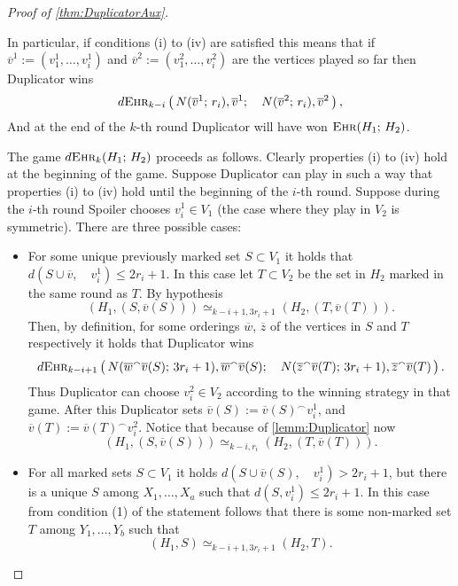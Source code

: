 \documentclass[12pt,notitlepage,a4paper]{article}
\theoremstyle{definition}
\newcommand{\ehr}{\textsc{Ehr}}
\begin{document}
\begin{proof}[Proof of \cref{thm:DuplicatorAux}]
\begin{itemize}
		
	\end{itemize}
	In particular, if conditions (i) to (iv) are satisfied this means
	that if $\overline{v}^1:=(v^1_1,\dots,v^1_i)$ and
	$\overline{v}^2:=(v^2_1,\dots, v^2_i)$ are the vertices played so far
	then Duplicator wins
	\[
	d\ehr_{k-i}\left(\,
	N(\overline{v}^1;\, r_i), \overline{v}^1; \quad
	N(\overline{v}^2;\, r_i),\overline{v}^2 \,
	\right),	
	\]
	And at the end of the $k$-th round Duplicator will have won
	$\ehr(H_1;\, H_2)$. \par
	The game $d\ehr_k(H_1; \, H_2)$ proceeds as follows.
	Clearly properties (i) to (iv) hold at the beginning of 
	the game.  Suppose
	Duplicator can play in such a way that properties (i) to (iv) hold 
	until the beginning of the $i$-th round. Suppose
	during the $i$-th round Spoiler chooses $v^1_i\in V_1$ 
	(the case where they play in $V_2$ is symmetric). There are 
	three possible cases:
	\begin{itemize}[leftmargin=*]
		\item For some unique previously marked set $S\subset V_1$ 
		it holds that $d(S\cup \overline{v},\quad v^1_i)\leq 2r_i +1$. 
		In this case let $T\subset V_2$ be the set in $H_2$ marked in the 
		same round as $T$. By hypothesis 
		\[ \left(H_1,(S,\overline{v}(S))\right)
		\simeq_{k-i+1,3r_i+1}
		\left(H_2,(T,\overline{v}(T))\right). 		
		\]
		Then, by definition,
		for some orderings $\overline{w}$, $\overline{z}$
		of the vertices in $S$ and $T$ respectively it holds that
		Duplicator wins
		\[
		d\ehr_{k-i+1}\left(\,
		N(\overline{w}^\smallfrown \overline{v}(S); \, 3r_i	+ 1)
		, \overline{w}^\smallfrown \overline{v}(S); \quad
		N(\overline{z}^\smallfrown \overline{v}(T); \, 3r_i	+ 1)
		, \overline{z}^\smallfrown \overline{v}(T)\,	
		\right).		
		\]
		Thus Duplicator can choose $v^2_i\in V_2$ according to the 
		winning strategy in that game. After this Duplicator sets 
		$\overline{v}(S):= \overline{v}(S)^\smallfrown v^1_i$, and
		$\overline{v}(T):= \overline{v}(T)^\smallfrown v^2_i$. Notice
		that because of \cref{lemm:Duplicator} now
		\[
		\left(H_1, (S,\overline{v}(S))\right)\simeq_{k-i,r_i}
		\left(H_2, (T,\overline{v}(T))\right).
		\]
		\item For all marked sets $S\subset V_1$ it holds
		$d(S\cup \overline{v}(S), \quad v^1_i)>2r_i +1$, but there is
		a unique $S$ among $X_1,\dots, X_a$ such that
		$d(S,v^1_i)\leq 2r_i+1$. In this case from condition (1)
		of the statement follows that there is some non-marked
		set $T$ among $Y_1,\dots, Y_b$ such that
		\[
		(H_1,S)\simeq_{k-i+1,3r_i+1} (H_2,T).\] 

\end{itemize}
\end{proof}
\end{document}
